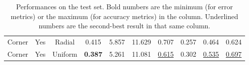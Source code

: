 \begin{table}
\begin{adjustwidth}{-0.2\textwidth}{-0.2\textwidth}
\begin{tabular}{c|c|c|c|c|c|c|c|c|c}
        Corner & Yes & Radial  &            0.415  &            5.857  &            11.629  &            0.707  &            0.257  &            0.464  &            0.624  \\
        Corner & Yes & Uniform &    \textbf{0.387} &            5.261  &            11.081  & \underline{0.615} &            0.302  & \underline{0.535} & \underline{0.697} \\
    \end{tabular}
    \end{adjustwidth}
    \caption{
        Performances on the test set.
        Bold numbers are the minimum (for error metrics) or the maximum (for accuracy metrics) in the column.
        Underlined numbers are the second-best result in that same column.
        \label{t:results}
    }
\end{table}

